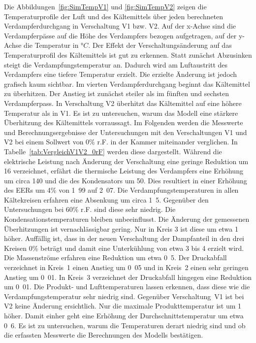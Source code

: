 Die Abbildungen~\ref{fig:SimTempV1} und \ref{fig:SimTempV2} zeigen die Temperaturprofile der Luft und des Kältemittels über jeden berechneten Verdampferdurchgang in Verschaltung V1 bzw. V2. Auf der x-Achse sind die Verdampferpässe auf die Höhe des Verdampfers bezogen aufgetragen, auf der y-Achse die Temperatur in °$C$. Der Effekt der Verschaltungsänderung auf das Temperaturprofil des Kältemittels ist gut zu erkennen. Statt zunächst Abzusinken steigt die Verdampfungstemperatur an. Dadurch wird am Luftaustritt des Verdampfers eine tiefere Temperatur erzielt. Die erzielte Änderung ist jedoch grafisch kaum sichtbar. Im vierten Verdampferdurchgang beginnt das Kältemittel zu überhitzen. Der Anstieg ist zunächst steiler als im fünften und sechsten Verdampferpass. In Verschaltung V2 überhitzt das Kältemittel auf eine höhere Temperatur als in V1. Es ist zu untersuchen, warum das Modell eine stärkere Überhitzung des Kältemittels vorraussagt. \newline
Im Folgenden werden die Messwerte und Berechnungsergebnisse der Untersuchungen mit den Verschaltungen V1 und V2 bei einem Sollwert von \unit{0}{\%} r.F. in der Kammer miteinander verglichen. In Tabelle~\ref{tab:VergleichV1V2_0rF} werden diese dargestellt. Während die elektrische Leistung nach Änderung der Verschaltung eine geringe Reduktion um \unit{16}{\watt} verzeichnet, erfährt die thermische Leistung des Verdampfers eine Erhöhung um circa \unit{140}{\watt} und die des Kondensators um \unit{50}{\watt}. Dies resultiert in einer Erhöhung des EERs um \unit{4}{\%} von \unit{1.99}{} auf \unit{2.07}{}.
Die Verdampfungstemperaturen in allen Kältekreisen erfahren eine Absenkung um circa \unit{1.5}{\kelvin}. Gegenüber den Untersuchungen bei \unit{60}{\%} r.F. sind diese sehr niedrig. Die Kondensationstemperaturen bleiben unbeeinflusst. Die Änderung der gemessenen Überhitzungen ist vernachlässigbar gering. Nur in Kreis 3 ist diese um etwa \unit{1}{\kelvin} höher. Auffällig ist, dass in der neuen Verschaltung der Dampfanteil in den drei Kreisen \unit{0}{\%} beträgt und damit eine Unterkühlung von etwa \unit{3}{\kelvin} bis \unit{4}{\kelvin} erzielt wird. Die Massenströme erfahren eine Reduktion um etwa \unit{0.5}{\gram\per\second}. Der Druckabfall verzeichnet in Kreis~1 einen Anstieg um \unit{0.05}{\bbar} und in Kreis~2 einen sehr geringen Anstieg um \unit{0.01}{\bbar}. In Kreis~3 verzeichnet der Druckabfall hingegen eine Reduktion um \unit{0.01}{\bbar}. Die Produkt- und Lufttemperaturen lassen erkennen, dass diese wie die Verdampfungstemperatur sehr niedrig sind. Gegenüber Verschaltung~V1 ist bei V2 keine Änderung ersichtlich. Nur die maximale Produkttemperatur ist um \unit{1}{\kelvin} höher. Damit einher geht eine Erhöhung der Durchschnittstemperatur um etwa \unit{0.6}{\kelvin}. Es ist zu untersuchen, warum die Temperaturen derart niedrig sind und ob die erfassten Messwerte die Berechnungen des Modells bestätigen.

